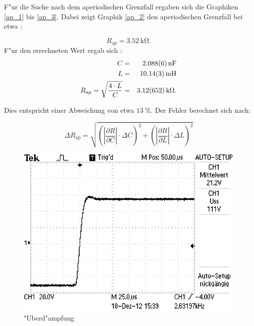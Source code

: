 	

	F"ur die Suche nach dem aperiodischen Grenzfall ergaben sich die Graphiken \eqref{ap_1} bis \eqref{ap_3}.
	Dabei zeigt Graphik \eqref{ap_2} den aperiodischen Grenzfall bei etwa :

	\begin{equation*}
		R_\mathrm{ap} = \SI{3.52}{\kilo\ohm}.
	\end{equation*}
		F"ur den errechneten Wert ergab sich :
	\begin{eqnarray*}
		C &=& \SI{2.088 (6)}{\nano \farad}\\
		L &=& \SI{10.14 (3)}{\milli \henry}\\
		R_\mathrm{ap} = \sqrt{\frac{4 \cdot L}{C}} &=& \SI{3.12 (652)}{\kilo\ohm}.
	\end{eqnarray*}

	Dies entspricht einer Abweichung von etwa $\SI{13}{\%}$.
	Der Fehler berechnet sich nach:

	\begin{equation}
		\Delta R_\mathrm{ap} = \sqrt{ \left( |\frac{\partial R}{\partial C}| \cdot \Delta C \right)^2 + \left( |\frac{\partial R}{\partial L}| \cdot \Delta L \right)^2}
	\end{equation}

	\begin{figure}[htbp]
			\centering
			\includegraphics[width = 12cm]{img/F0003TEK.jpg}
			\caption{"Uberd"ampfung}
			\label{ap_1}
		\end{figure}	

